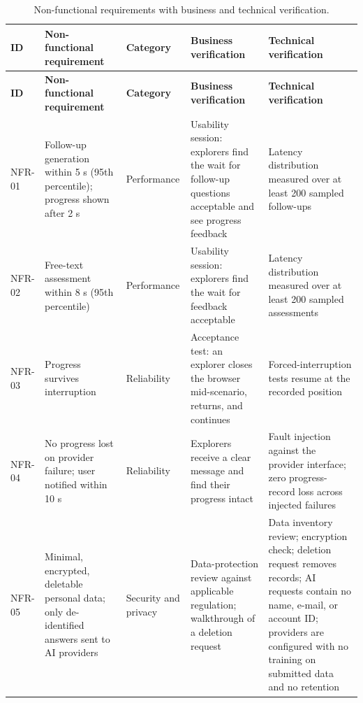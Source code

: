 {\small
\begin{longtable}{|>{\raggedright\arraybackslash}p{}|>{\raggedright\arraybackslash}p{}|>{\raggedright\arraybackslash}p{}|>{\raggedright\arraybackslash}p{}|>{\raggedright\arraybackslash}p{}|}
\caption{Non-functional requirements with business and technical verification.} \\
\hline
\textbf{ID} & \textbf{Non-functional requirement} & \textbf{Category} & \textbf{Business verification} & \textbf{Technical verification} \\ \hline
\endfirsthead
\hline
\textbf{ID} & \textbf{Non-functional requirement} & \textbf{Category} & \textbf{Business verification} & \textbf{Technical verification} \\ \hline
\endhead
NFR-01 & Follow-up generation within 5 s (95th percentile); progress shown after 2 s & Performance & Usability session: explorers find the wait for follow-up questions acceptable and see progress feedback & Latency distribution measured over at least 200 sampled follow-ups \\ \hline
NFR-02 & Free-text assessment within 8 s (95th percentile) & Performance & Usability session: explorers find the wait for feedback acceptable & Latency distribution measured over at least 200 sampled assessments \\ \hline
NFR-03 & Progress survives interruption & Reliability & Acceptance test: an explorer closes the browser mid-scenario, returns, and continues & Forced-interruption tests resume at the recorded position \\ \hline
NFR-04 & No progress lost on provider failure; user notified within 10 s & Reliability & Explorers receive a clear message and find their progress intact & Fault injection against the provider interface; zero progress-record loss across injected failures \\ \hline
NFR-05 & Minimal, encrypted, deletable personal data; only de-identified answers sent to AI providers & Security and privacy & Data-protection review against applicable regulation; walkthrough of a deletion request & Data inventory review; encryption check; deletion request removes records; AI requests contain no name, e-mail, or account ID; providers are configured with no training on submitted data and no retention \\ \hline

\end{longtable}}
